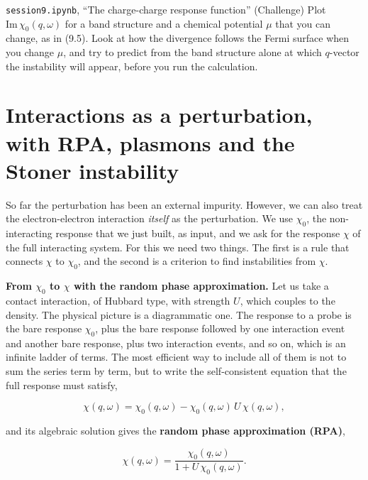 

\begin{notebookbox}{\texttt{session9.ipynb}, ``The charge-charge response function'' (Challenge)}
Plot $\mathrm{Im}\,\chi_0(q,\omega)$ for a band structure and a chemical potential $\mu$ that you can
change, as in (9.5). Look at how the divergence follows the Fermi surface when you change $\mu$, and
try to predict from the band structure alone at which $q$-vector the instability will appear, before
you run the calculation.
\end{notebookbox}

\section{Interactions as a perturbation, with RPA, plasmons and the Stoner instability}

So far the perturbation has been an external impurity. However, we can also treat the
electron-electron interaction \emph{itself} as the perturbation. We use $\chi_0$, the
non-interacting response that we just built, as input, and we ask for the response $\chi$ of the full
interacting system. For this we need two things. The first is a rule that connects $\chi$ to $\chi_0$,
and the second is a criterion to find instabilities from $\chi$.

\textbf{From $\chi_0$ to $\chi$ with the random phase approximation.} Let us take a contact interaction,
of Hubbard type, with strength $U$, which couples to the density. The physical picture is a
diagrammatic one. The response to a probe is the bare response $\chi_0$, plus the bare response
followed by one interaction event and another bare response, plus two interaction events, and so on,
which is an infinite ladder of terms. The most efficient way to include all of them is not to sum the
series term by term, but to write the self-consistent equation that the full response must satisfy,

\begin{equation*}
\chi(q,\omega) = \chi_0(q,\omega) - \chi_0(q,\omega)\, U\, \chi(q,\omega),
\end{equation*}

and its algebraic solution gives the \textbf{random phase approximation (RPA)},

\begin{equation}
\chi(q,\omega) = \frac{\chi_0(q,\omega)}{1 + U\,\chi_0(q,\omega)}.
\end{equation}

